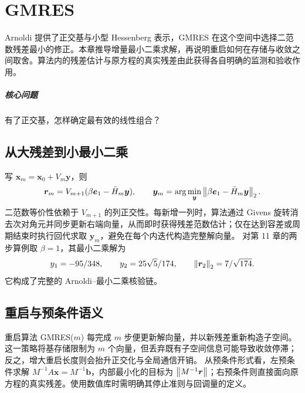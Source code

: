 \chapter{GMRES}\label{v0ch:12}
\begin{chaptersummary}
Arnoldi 提供了正交基与小型 Hessenberg 表示，GMRES 在这个空间中选择二范数残差最小的修正。本章推导增量最小二乘求解，再说明重启如何在存储与收敛之间取舍。算法内的残差估计与原方程的真实残差由此获得各自明确的监测和验收作用。
\end{chaptersummary}
\paragraph{核心问题}有了正交基，怎样确定最有效的线性组合？

\section{从大残差到小最小二乘}
写 $\bm x_m=\bm x_0+V_m\bm y$，则
\[
 \bm r_m=V_{m+1}(\beta\bm e_1-\bar H_m\bm y),\qquad
 \bm y_m=\arg\min_{\bm y}\left\lVert \beta\bm e_1-\bar H_m\bm y\right\rVert_2.
\]
二范数等价性依赖于 $V_{m+1}$ 的列正交性。每新增一列时，算法通过 Givens 旋转消去次对角元并同步更新右端向量，从而即时获得残差范数估计；仅在达到容差或周期结束时执行回代求取 $\bm y_m$，避免在每个内迭代构造完整解向量。
对第 11 章的两步算例取 $\beta=1$，其最小二乘解为
\[
 y_1=-95/348,\qquad y_2=25\sqrt5/174,\qquad
 \left\lVert \bm r_2\right\rVert_2=7/\sqrt{174}.
\]
它构成了完整的 Arnoldi--最小二乘核验链。
\section{重启与预条件语义}
重启算法 GMRES($m$) 每完成 $m$ 步便更新解向量，并以新残差重新构造子空间。这一策略将基存储限制为 $m$ 个向量，但丢弃既有子空间信息可能导致收敛停滞；反之，增大重启长度则会抬升正交化与全局通信开销。
从预条件形式看，左预条件求解 $M^{-1}A\bm x=M^{-1}\bm b$，内部最小化的目标为 $\left\lVert M^{-1}\bm r\right\rVert$；右预条件则直接面向原方程的真实残差。使用数值库时需明确其停止准则与回调量的定义。
